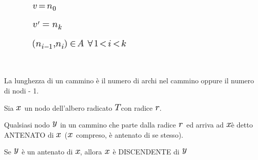 \documentclass{article}
\begin{document}
{~~~~~~~~}\includegraphics{images/image79.png}

{~~~~~~~~}\includegraphics{images/image80.png}

{~~~~~~~~}\includegraphics{images/image81.png}

{~~~~~~~~}

{La lunghezza di un cammino è il numero di archi nel cammino oppure il
numero di nodi - 1.}

{}

{Sia }\includegraphics{images/image82.png}{~un nodo dell'albero radicato
}\includegraphics{images/image37.png}{con radice
}\includegraphics{images/image83.png}{.}

{Qualsiasi nodo }\includegraphics{images/image84.png}{~in un cammino che
parte dalla radice }\includegraphics{images/image83.png}{~ed arriva ad
}\includegraphics{images/image82.png}{è detto ANTENATO di
}\includegraphics{images/image82.png}{~(}\includegraphics{images/image82.png}{~compreso,
è antenato di se stesso).}

{}

{Se }\includegraphics{images/image84.png}{~è un antenato di
}\includegraphics{images/image82.png}{, allora
}\includegraphics{images/image82.png}{~è DISCENDENTE di
}\includegraphics{images/image84.png}
\end{document}
